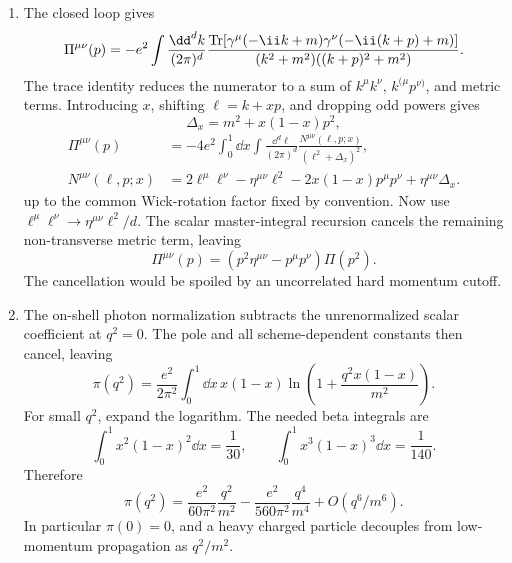 \begin{enumerate}
\begin{enumerate}
\item
The closed loop gives
\[
 \Pi^{\mu\nu}(p)=-e^2\int\frac{\dd^dk}{(2\pi)^d}
 \frac{\operatorname{Tr}[
 \gamma^\mu(-\ii\sl k+m)\gamma^\nu(-\ii(\sl k+\sl p)+m)]}
 {(k^2+m^2)((k+p)^2+m^2)}.
\]
The trace identity reduces the numerator to a sum of
\(k^\mu k^\nu\), \(k^{(\mu}p^{\nu)}\), and metric terms.  Introducing
\(x\), shifting \(\ell=k+xp\), and dropping odd powers gives
\[
 \Delta_x=m^2+x(1-x)p^2,
\]
\[
 \begin{aligned}
 \Pi^{\mu\nu}(p)
  &=-4e^2\int_0^1\dd x\int\frac{\dd^d\ell}{(2\pi)^d}
   \frac{N^{\mu\nu}(\ell,p;x)}{(\ell^2+\Delta_x)^2},\\
 N^{\mu\nu}(\ell,p;x)
  &=2\ell^\mu\ell^\nu-\eta^{\mu\nu}\ell^2
    -2x(1-x)p^\mu p^\nu
    +\eta^{\mu\nu}\Delta_x .
 \end{aligned}
\]
up to the common Wick-rotation factor fixed by convention.  Now use
\(\ell^\mu\ell^\nu\to\eta^{\mu\nu}\ell^2/d\).  The scalar master-integral
recursion cancels the remaining non-transverse metric term, leaving
\[
 \Pi^{\mu\nu}(p)
 =(p^2\eta^{\mu\nu}-p^\mu p^\nu)\Pi(p^2).
\]
The cancellation would be spoiled by an uncorrelated hard momentum cutoff.
\item
The on-shell photon normalization subtracts the unrenormalized scalar
coefficient at \(q^2=0\).  The pole and all scheme-dependent constants then
cancel, leaving
\[
 \boxed{\;
 \pi(q^2)=\frac{e^2}{2\pi^2}\int_0^1\dd x\,x(1-x)
 \ln\left(1+\frac{q^2x(1-x)}{m^2}\right).
 \;}
\]
For small \(q^2\), expand the logarithm.  The needed beta integrals are
\[
 \int_0^1x^2(1-x)^2\dd x=\frac1{30},\qquad
 \int_0^1x^3(1-x)^3\dd x=\frac1{140}.
\]
Therefore
\[
 \boxed{\;
 \pi(q^2)=\frac{e^2}{60\pi^2}\frac{q^2}{m^2}
 -\frac{e^2}{560\pi^2}\frac{q^4}{m^4}
 +O(q^6/m^6).
 \;}
\]
In particular \(\pi(0)=0\), and a heavy charged particle decouples from
low-momentum propagation as \(q^2/m^2\).
\end{enumerate}


\end{enumerate}
